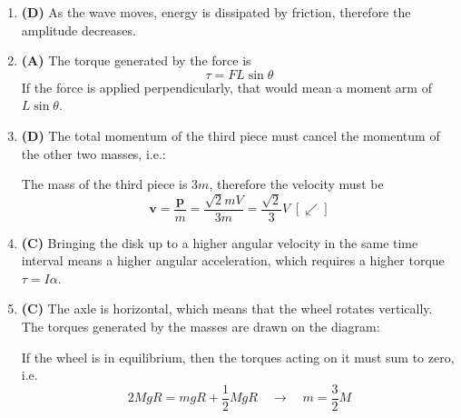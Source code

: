 \documentclass{../../oss-handout}
\begin{document}
\begin{enumerate}[leftmargin=17pt]
\item\textbf{(D)} As the wave moves, energy is dissipated by friction, therefore
  the amplitude decreases.

\item\textbf{(A)} The torque generated by the force is
  \begin{displaymath}
    \tau=FL\sin\theta
  \end{displaymath}
  If the force is applied perpendicularly, that would mean a moment arm of
  $\boxed{L\sin\theta}$.

\item\textbf{(D)} The total momentum of the third piece must cancel the momentum
  of the other two masses, i.e.:
  \begin{center}
  \end{center}
  The mass of the third piece is $3m$, therefore the velocity must be
  \begin{equation*}
    \bm{v}=\frac{\bm{p}}m
    =\frac{\sqrt2mV}{3m}=\boxed{\frac{\sqrt2}3V\;[\swarrow]}
  \end{equation*}
\item\textbf{(C)} Bringing the disk up to a higher angular velocity in the same
  time interval means a higher angular acceleration, which requires a higher
  torque $\tau=I\alpha$.
  \newpage
  
\item\textbf{(C)} The axle is horizontal, which means that the wheel rotates
  vertically. The torques generated by the masses are drawn on the diagram:
  \begin{center}
  \end{center}
  If the wheel is in equilibrium, then the torques acting on it must sum to
  zero, i.e.
  \begin{displaymath}
    2MgR=mgR+\frac12MgR \quad\longrightarrow\quad\boxed{m=\frac32M}
  \end{displaymath}


\end{enumerate}
\end{document}
